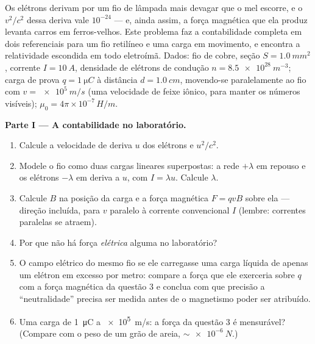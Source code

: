 \begin{problem}\label{pb:b3:covariant-electromagnetism:1}
Os elétrons derivam por um fio de lâmpada mais devagar que o mel
escorre, e o $v^2/c^2$ dessa deriva vale $10^{-24}$ --- e, ainda assim,
a força magnética que ela produz levanta carros em ferros-velhos. Este
problema faz a contabilidade completa em dois referenciais para um fio
retilíneo e uma carga em movimento, e encontra a relatividade escondida
em todo eletroímã. Dados: fio de cobre, seção $S = \qty{1.0}{mm^2}$,
corrente $I = \qty{10}{A}$, densidade de elétrons de condução
$n = \qty{8.5e28}{m^{-3}}$; carga de prova
$q = \qty{1}{\micro C}$ à distância $d = \qty{1.0}{cm}$, movendo-se
paralelamente ao fio com $v = \qty{e5}{m/s}$ (uma velocidade de feixe
iônico, para manter os números visíveis); $\mu_0 = 4\pi\times10^{-7}\,\unit{H/m}$.

\medskip\noindent\textbf{Parte I --- A contabilidade no laboratório.}
\begin{enumerate}
  \item Calcule a velocidade de deriva $u$ dos elétrons e $u^2/c^2$.
  \item Modele o fio como duas cargas lineares superpostas: a rede
        $+\lambda$ em repouso e os elétrons $-\lambda$ em deriva a
        $u$, com $I = \lambda u$. Calcule $\lambda$.
  \item Calcule $B$ na posição da carga e a força magnética
        $F = qvB$ sobre ela --- direção incluída, para $v$ paralelo à
        corrente convencional $I$ (lembre: correntes paralelas se
        atraem).
  \item Por que não há força \emph{elétrica} alguma no laboratório?
  \item O campo elétrico do mesmo fio se ele carregasse uma carga
        líquida de apenas um elétron em excesso por metro: compare a
        força que ele exerceria sobre $q$ com a força magnética da
        questão 3 e conclua com que precisão a ``neutralidade''
        precisa ser medida antes de o magnetismo poder ser atribuído.
  \item Uma carga de \qty{1}{\micro C} a \qty{e5}{m/s}: a força da
        questão 3 é mensurável? (Compare com o peso de um grão de
        areia, $\sim\qty{e-6}{N}$.)
\end{enumerate}


\end{problem}
